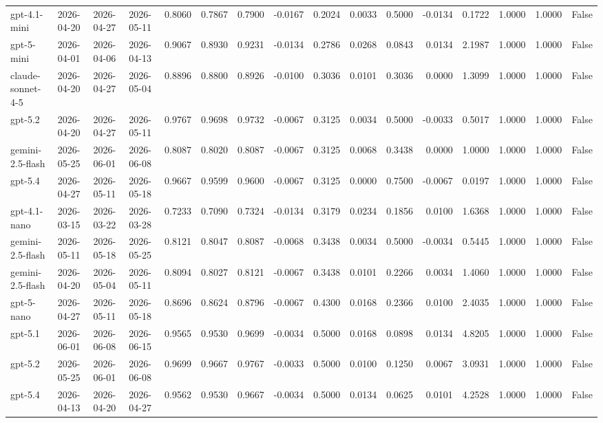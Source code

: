 \begin{table}
\begin{tabular}{llllrrrrrrrrrrrr}
gpt-4.1-mini & 2026-04-20 & 2026-04-27 & 2026-05-11 & 0.8060 & 0.7867 & 0.7900 & -0.0167 & 0.2024 & 0.0033 & 0.5000 & -0.0134 & 0.1722 & 1.0000 & 1.0000 & False \\
gpt-5-mini & 2026-04-01 & 2026-04-06 & 2026-04-13 & 0.9067 & 0.8930 & 0.9231 & -0.0134 & 0.2786 & 0.0268 & 0.0843 & 0.0134 & 2.1987 & 1.0000 & 1.0000 & False \\
claude-sonnet-4-5 & 2026-04-20 & 2026-04-27 & 2026-05-04 & 0.8896 & 0.8800 & 0.8926 & -0.0100 & 0.3036 & 0.0101 & 0.3036 & 0.0000 & 1.3099 & 1.0000 & 1.0000 & False \\
gpt-5.2 & 2026-04-20 & 2026-04-27 & 2026-05-11 & 0.9767 & 0.9698 & 0.9732 & -0.0067 & 0.3125 & 0.0034 & 0.5000 & -0.0033 & 0.5017 & 1.0000 & 1.0000 & False \\
gemini-2.5-flash & 2026-05-25 & 2026-06-01 & 2026-06-08 & 0.8087 & 0.8020 & 0.8087 & -0.0067 & 0.3125 & 0.0068 & 0.3438 & 0.0000 & 1.0000 & 1.0000 & 1.0000 & False \\
gpt-5.4 & 2026-04-27 & 2026-05-11 & 2026-05-18 & 0.9667 & 0.9599 & 0.9600 & -0.0067 & 0.3125 & 0.0000 & 0.7500 & -0.0067 & 0.0197 & 1.0000 & 1.0000 & False \\
gpt-4.1-nano & 2026-03-15 & 2026-03-22 & 2026-03-28 & 0.7233 & 0.7090 & 0.7324 & -0.0134 & 0.3179 & 0.0234 & 0.1856 & 0.0100 & 1.6368 & 1.0000 & 1.0000 & False \\
gemini-2.5-flash & 2026-05-11 & 2026-05-18 & 2026-05-25 & 0.8121 & 0.8047 & 0.8087 & -0.0068 & 0.3438 & 0.0034 & 0.5000 & -0.0034 & 0.5445 & 1.0000 & 1.0000 & False \\
gemini-2.5-flash & 2026-04-20 & 2026-05-04 & 2026-05-11 & 0.8094 & 0.8027 & 0.8121 & -0.0067 & 0.3438 & 0.0101 & 0.2266 & 0.0034 & 1.4060 & 1.0000 & 1.0000 & False \\
gpt-5-nano & 2026-04-27 & 2026-05-11 & 2026-05-18 & 0.8696 & 0.8624 & 0.8796 & -0.0067 & 0.4300 & 0.0168 & 0.2366 & 0.0100 & 2.4035 & 1.0000 & 1.0000 & False \\
gpt-5.1 & 2026-06-01 & 2026-06-08 & 2026-06-15 & 0.9565 & 0.9530 & 0.9699 & -0.0034 & 0.5000 & 0.0168 & 0.0898 & 0.0134 & 4.8205 & 1.0000 & 1.0000 & False \\
gpt-5.2 & 2026-05-25 & 2026-06-01 & 2026-06-08 & 0.9699 & 0.9667 & 0.9767 & -0.0033 & 0.5000 & 0.0100 & 0.1250 & 0.0067 & 3.0931 & 1.0000 & 1.0000 & False \\
gpt-5.4 & 2026-04-13 & 2026-04-20 & 2026-04-27 & 0.9562 & 0.9530 & 0.9667 & -0.0034 & 0.5000 & 0.0134 & 0.0625 & 0.0101 & 4.2528 & 1.0000 & 1.0000 & False \\

\end{tabular}
\end{table}
